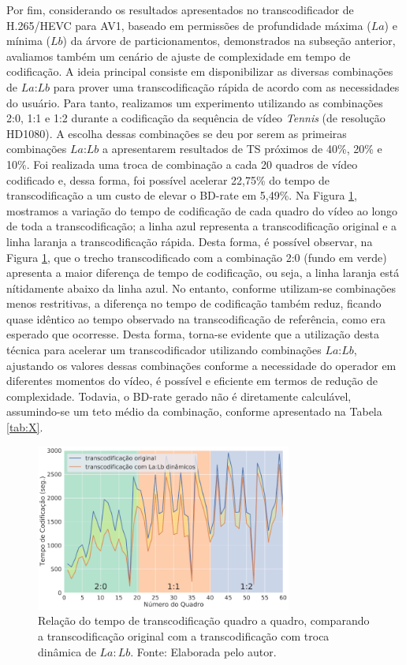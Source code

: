 Por fim, considerando os resultados apresentados no transcodificador de H.265/HEVC para AV1, baseado em permissões de profundidade máxima ($La$) e mínima ($Lb$) da árvore de particionamentos, demonstrados na subseção anterior, avaliamos também um cenário de ajuste de complexidade em tempo de codificação. A ideia principal consiste em  disponibilizar as diversas combinações de $La$:$Lb$ para prover uma transcodificação rápida de acordo com as necessidades do usuário. Para tanto, realizamos um experimento utilizando as combinações 2:0, 1:1 e 1:2 durante a codificação da sequência de vídeo \textit{Tennis} (de resolução HD1080). A escolha dessas combinações se deu por serem as primeiras combinações $La$:$Lb$ a apresentarem resultados de TS próximos de 40\%, 20\% e 10\%. Foi realizada uma troca de combinação a cada 20 quadros de vídeo codificado e, dessa forma, foi possível acelerar 22,75\% do tempo de transcodificação a um custo de elevar o BD-rate em 5,49\%. Na Figura \ref{fig:22}, mostramos a variação do tempo de codificação de cada quadro do vídeo ao longo de toda a transcodificação; a linha azul representa a transcodificação original e a linha laranja a transcodificação rápida. Desta forma, é possível observar, na Figura \ref{fig:22}, que o trecho transcodificado com a combinação 2:0 (fundo em verde) apresenta a maior diferença de tempo de codificação, ou seja, a linha laranja está nítidamente abaixo da linha azul. No entanto, conforme utilizam-se combinações menos restritivas, a diferença no tempo de codificação também reduz, ficando quase idêntico ao tempo observado na transcodificação de referência, como era esperado que ocorresse. Desta forma, torna-se evidente que a utilização desta técnica para acelerar um transcodificador utilizando combinações $La$:$Lb$, ajustando os valores dessas combinações conforme a necessidade do operador em diferentes momentos do vídeo, é possível e eficiente em termos de redução de complexidade. Todavia, o BD-rate gerado não é diretamente calculável, assumindo-se um teto médio da combinação, conforme apresentado na Tabela \ref{tab:X}.

\begin{figure}
    \centering
    \includegraphics[width=0.75\textwidth]{FIGURES/fig_22.png}
    \caption{Relação do tempo de transcodificação quadro a quadro, comparando a transcodificação original com a transcodificação com troca dinâmica de $La:Lb$. Fonte: Elaborada pelo autor.}
    \label{fig:22}
\end{figure}
